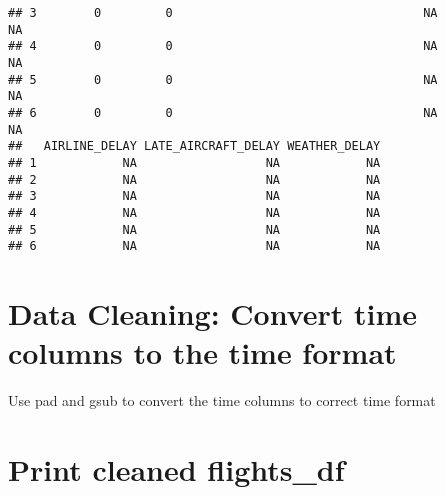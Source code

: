 \documentclass[]{article}
\begin{document}
\begin{verbatim}
## 3        0         0                                   NA             NA
## 4        0         0                                   NA             NA
## 5        0         0                                   NA             NA
## 6        0         0                                   NA             NA
##   AIRLINE_DELAY LATE_AIRCRAFT_DELAY WEATHER_DELAY
## 1            NA                  NA            NA
## 2            NA                  NA            NA
## 3            NA                  NA            NA
## 4            NA                  NA            NA
## 5            NA                  NA            NA
## 6            NA                  NA            NA
\end{verbatim}

\hypertarget{data-cleaning-convert-time-columns-to-the-time-format}{%
\section{Data Cleaning: Convert time columns to the time
format}\label{data-cleaning-convert-time-columns-to-the-time-format}}

Use pad and gsub to convert the time columns to correct time format

\hypertarget{print-cleaned-flights_df}{%
\section{Print cleaned flights\_df}\label{print-cleaned-flights_df}}
\end{document}
